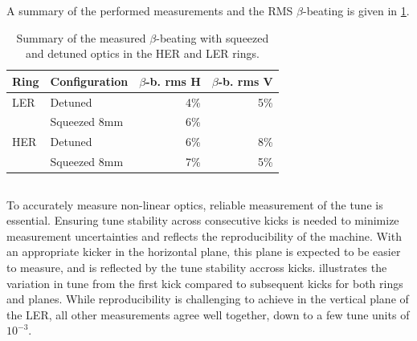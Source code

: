 A summary of the performed measurements and the RMS $\beta$-beating is given in
\cref{tab:kek:summary_beating}.

\begin{table}
    \centering
    \begin{tabular}{llrr}
        \toprule
        Ring & Configuration & $\beta$-b. rms H & $\beta$-b. rms V \\
        \midrule
        LER  &  Detuned      & 4\%              & 5\%   \\
            &  Squeezed 8mm & 6\%              &       \\
        HER  &  Detuned      & 6\%              & 8\%  \\
            &  Squeezed 8mm & 7\%              & 5\%  \\
        \bottomrule
    \end{tabular}
    \caption{Summary of the measured $\beta$-beating with squeezed and detuned optics in the HER
    and LER rings.}
    \label{tab:kek:summary_beating}
\end{table}



\FloatBarrier
\subsection{}

\FloatBarrier
\subsubsection{}

To accurately measure non-linear optics, reliable measurement of the tune is essential. Ensuring
tune stability across consecutive kicks is needed to minimize measurement uncertainties and reflects
the reproducibility of the machine. With an appropriate kicker in the horizontal plane, this plane
is expected to be easier to measure, and is reflected by the tune stability accross kicks.
 illustrates the variation in tune from the first kick compared to subsequent
kicks for both rings and planes.
While reproducibility is challenging to achieve in the vertical plane of the LER, all other
measurements agree well together, down to a few tune units of $10^{-3}$.

